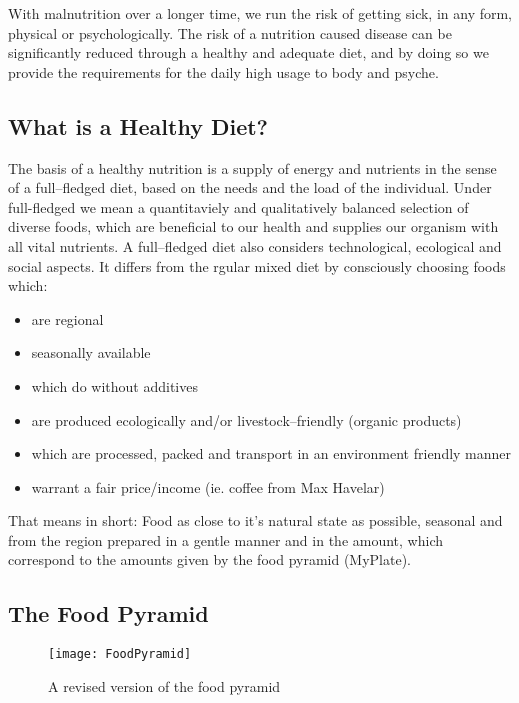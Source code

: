 \documentclass[../main.tex]{subfiles}
\begin{document}
With malnutrition over a longer time, we run the risk of getting sick, in any form, physical or psychologically.
The risk of a nutrition caused disease can be significantly reduced through a  healthy and adequate diet,
and by doing so we provide the requirements for the daily high usage to body and psyche.

\subsection{What is a Healthy Diet?}

The basis of a healthy nutrition is a supply of energy and nutrients in the sense of a full--fledged diet,
based on the needs and the load of the individual.
Under full-fledged we mean a quantitaviely and qualitatively balanced selection of diverse foods,
which are beneficial to our health and supplies our organism with all vital nutrients.
A full--fledged diet also considers technological, ecological and social aspects.
It differs from the rgular mixed diet by consciously choosing foods which:
\begin{itemize}
\item are regional
\item seasonally available
\item which do without additives
\item are produced ecologically and/or livestock--friendly (organic products)
\item which are processed, packed and transport in an environment friendly manner
  \item warrant a fair price/income (ie. coffee from Max Havelar)
  \end{itemize}

  That means in short: Food as close to it's natural state as possible, seasonal and from the region
  prepared in a gentle manner and in the amount, which correspond to the amounts given by the food pyramid (MyPlate).

  \subsection{The Food Pyramid}

  
\begin{figure}[htb!]
\centering
  \texttt{[image: FoodPyramid]}
  \caption{A revised version of the food pyramid~\cite{FoodPyramid}}
\end{figure}
\end{document}
